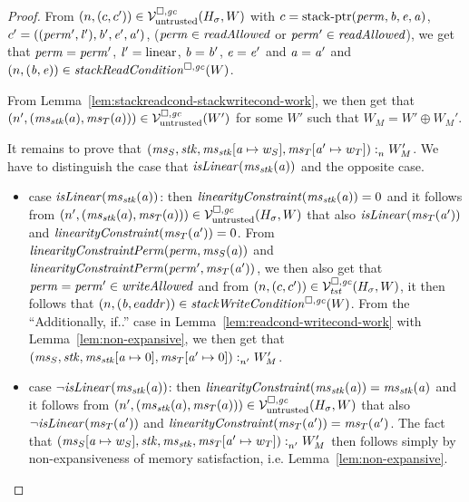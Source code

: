 \documentclass[a4paper]{article}
\begin{document}
\begin{proof}
  From $\npair{(c,c')}\in\lrv(H_\sigma,W)$ with $c = \stkptr{\perm,\baddr,\eaddr,\aaddr}$, $c' = ((\perm',\lin'),\baddr',\eaddr',\aaddr')$, ($\perm \in \readAllowed{}$ or $\perm' \in \readAllowed{}$), we get that $\perm = \perm'$, $\lin' = \linear$, $\baddr = \baddr'$, $\eaddr = \eaddr'$ and $\aaddr = \aaddr'$ and $\npair{(\baddr,\eaddr)} \in \stackReadCond{W}$.

  From Lemma~\ref{lem:stackreadcond-stackwritecond-work}, we then get that $\npair[n']{(\ms_\stk(a),\ms_T(a))}\in\lrv(W')$ for some $W'$ such that $W_M = W' \oplus W_M'$.
  

  It remains to prove that $\memSat{(\ms_S,\stk,\ms_\stk\update{\aaddr}{w_S},\ms_T\update{\aaddr'}{w_T})}{W_M'}$.
  We have to distinguish the case that $\isLinear{\ms_\stk(\aaddr)}$ and the opposite case.
  \begin{itemize}
  \item case $\isLinear{\ms_\stk(\aaddr)}$: then $\linCons{\ms_\stk(\aaddr)} = 0$ and it follows from $\npair[n']{(\ms_\stk(a),\ms_T(a))}\in\lrv(H_\sigma,W)$ that also $\isLinear{\ms_T(\aaddr')}$  and $\linCons{\ms_T(\aaddr')} = 0$. 
    From $\linConsPerm{\perm}{\ms_S(\aaddr)}$ and $\linConsPerm{\perm'}{\ms_T(\aaddr')}$, we then also get that $\perm = \perm' \in \writeAllowed{}$ and from $\npair{(c,c')}\in\lrvg{\trust}(H_\sigma,W)$, it then follows that $\npair{(\baddr,eaddr)} \in \stackWriteCond{W}$.
    From the ``Additionally, if..'' case in Lemma~\ref{lem:readcond-writecond-work} with Lemma~\ref{lem:non-expansive}, we then get that $\memSat[n']{(\ms_S,\stk,\ms_\stk\update{\aaddr}{0},\ms_T\update{\aaddr'}{0})}{W_M'}$.

  \item case $\neg\isLinear{\ms_\stk(\aaddr)}$: then $\linCons{\ms_\stk(\aaddr)} = \ms_\stk(\aaddr)$ and it follows from $\npair[n']{(\ms_\stk(a),\ms_T(a))}\in\lrv(H_\sigma,W)$ that also $\neg\isLinear{\ms_T(\aaddr')}$  and $\linCons{\ms_T(\aaddr')} = \ms_T(\aaddr')$.
    The fact that $\memSat[n']{(\ms_S\update{\aaddr}{w_S},\stk,\ms_\stk,\ms_T\update{\aaddr'}{w_T})}{W_M'}$ then follows simply by non-expansiveness of memory satisfaction, i.e. Lemma~\ref{lem:non-expansive}.
  \end{itemize}
\end{proof}
\end{document}
